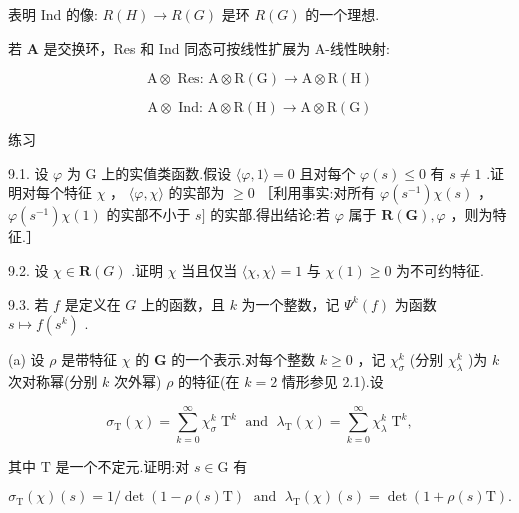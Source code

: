 \documentclass[10pt]{article}
\begin{document}
表明 Ind 的像: \(R\left( H\right)  \rightarrow  R\left( G\right)\) 是环 \(R\left( G\right)\) 的一个理想.

若 \(\mathbf{A}\) 是交换环，Res 和 Ind 同态可按线性扩展为 A-线性映射:

\[
\mathrm{A} \otimes  \text{ Res: }\mathrm{A} \otimes  \mathrm{R}\left( \mathrm{G}\right)  \rightarrow  \mathrm{A} \otimes  \mathrm{R}\left( \mathrm{H}\right)
\]

\[
\mathrm{A} \otimes  \text{ Ind: }\mathrm{A} \otimes  \mathrm{R}\left( \mathrm{H}\right)  \rightarrow  \mathrm{A} \otimes  \mathrm{R}\left( \mathrm{G}\right)
\]

练习

9.1. 设 \(\varphi\) 为 G 上的实值类函数.假设 \(\langle \varphi ,1\rangle  = 0\) 且对每个 \(\varphi \left( s\right)  \leq  0\) 有 \(s \neq  1\) .证明对每个特征 \(\chi\) ， \(\langle \varphi ,\chi \rangle\) 的实部为 \(\geq  0\) ［利用事实:对所有 \(\varphi \left( {s}^{-1}\right) \chi \left( s\right)\) ， \(\varphi \left( {s}^{-1}\right) \chi \left( 1\right)\) 的实部不小于 \(s\rbrack\) 的实部.得出结论:若 \(\varphi\) 属于 \(\mathbf{R}\left( \mathbf{G}\right) ,\varphi\) ，则为特征.］

9.2. 设 \(\chi  \in  \mathbf{R}\left( G\right)\) .证明 \(\chi\) 当且仅当 \(\langle \chi ,\chi \rangle  = 1\) 与 \(\chi \left( 1\right)  \geq  0\) 为不可约特征.

9.3. 若 \(f\) 是定义在 \(G\) 上的函数，且 \(k\) 为一个整数，记 \({\Psi }^{k}\left( f\right)\) 为函数 \(s \mapsto  f\left( {s}^{k}\right)\) .

(a) 设 \(\rho\) 是带特征 \(\chi\) 的 \(\mathbf{G}\) 的一个表示.对每个整数 \(k \geq  0\) ，记 \({\chi }_{\sigma }^{k}\) (分别 \({\chi }_{\lambda }^{k}\) )为 \(k\) 次对称幂(分别 \(k\) 次外幂) \(\rho\) 的特征(在 \(k = 2\) 情形参见 2.1).设

\[
{\sigma }_{\mathrm{T}}\left( \chi \right)  = \mathop{\sum }\limits_{{k = 0}}^{\infty }{\chi }_{\sigma }^{k}{\mathrm{\;T}}^{k}\;\text{ and }\;{\lambda }_{\mathrm{T}}\left( \chi \right)  = \mathop{\sum }\limits_{{k = 0}}^{\infty }{\chi }_{\lambda }^{k}{\mathrm{\;T}}^{k},
\]

其中 \(\mathrm{T}\) 是一个不定元.证明:对 \(s \in  \mathrm{G}\) 有

\[
{\sigma }_{\mathrm{T}}\left( \chi \right) \left( s\right)  = 1/\det \left( {1 - \rho \left( s\right) \mathrm{T}}\right) \;\text{ and }\;{\lambda }_{\mathrm{T}}\left( \chi \right) \left( s\right)  = \det \left( {1 + \rho \left( s\right) \mathrm{T}}\right) .
\]
\end{document}
